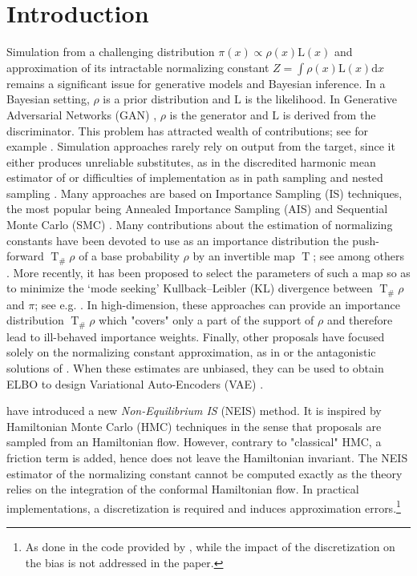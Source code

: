 \documentclass{article}
\def\transfo{\operatorname{T}}
\def\rmd{\operatorname{d}\hspace{-2pt}}
\def\rmd{\mathrm{d}}
\newcommand{\1}{\mathds{1}}
\def\const{Z}
\def\rmd{\mathrm{d}}
\def\likelihood{\mathrm{L}}
\begin{document}
\section{Introduction}
Simulation from a challenging distribution $\pi(x)\propto\rho(x)\likelihood(x)$ and approximation of its intractable normalizing constant $\const=\int \rho(x) \likelihood(x) \rmd x$ remains a significant issue for generative models and Bayesian inference. In a Bayesian setting, $\rho$ is a prior distribution and $\likelihood$ is the likelihood. In Generative Adversarial Networks (GAN) \cite{turner:hung:2019, che:bengio:2020}, $\rho$ is the generator and $\likelihood$ is derived from the discriminator.
This problem has attracted wealth of  contributions; see for example \cite{chenetal00}. Simulation approaches rarely rely on output from the target, since
it either produces unreliable substitutes, as in the discredited harmonic mean estimator of \cite{newton:raftery:1994} or difficulties of implementation as in path sampling \cite{gelman1998simulating} and nested sampling \cite{skilling2006nested,chopin:robert:2010}. Many approaches are based on Importance Sampling (IS) techniques, the most popular being Annealed Importance Sampling (AIS) \cite{neal:2001, wu:burda:grosse:2016,ding2019learning} and Sequential Monte Carlo (SMC) \cite{del2006sequential}. Many contributions about the estimation of normalizing constants have been devoted to use as an importance distribution the push-forward $\transfo_{\#} \rho$ of a base probability $\rho$ by an invertible map $\transfo$; see among others \cite{jarzynski2002targeted,meng2002warp,neal2005hamiltonian,cuendet2006statistical,procacci2006crooks}. More recently, it has been proposed to select the parameters of such a map so as to minimize the `mode seeking' Kullback--Leibler (KL) divergence between  $\transfo_{\#}\rho$ and $\pi$; see e.g. \cite{ el2012bayesian,muller2018neural,papamakarios2019normalizing,prangle2019distilling,wirnsberger2020targeted}. In high-dimension, these approaches can provide an importance distribution $\transfo_{\#}\rho$ which "covers" only a part of the support of  $\rho$ and therefore lead to ill-behaved importance weights.
Finally, other proposals have focused solely on the normalizing constant approximation, as in \cite{chib:1995} or the antagonistic solutions of \cite{geyer:1993,gutmann:hyvarinen:2012}. When these estimates are unbiased, they can be used to obtain ELBO to design Variational Auto-Encoders (VAE) \cite{mnih2016variational}.

\cite{rotskoff:vanden-eijden:2019} have introduced a new \emph{Non-Equilibrium IS} (NEIS) method.
It is inspired by Hamiltonian Monte Carlo (HMC) techniques in the sense that proposals are sampled from an Hamiltonian flow.
However, contrary to "classical" HMC, a friction term is added, hence does not leave the Hamiltonian invariant.
The NEIS estimator of the normalizing constant cannot be computed exactly as the theory relies on the integration of the conformal Hamiltonian flow. In practical implementations, a discretization is required and induces approximation errors.\footnote{As done in the code provided by
  \cite{rotskoff:vanden-eijden:2019}, while the impact of the  discretization on the bias is not  addressed in the paper.}
\end{document}
